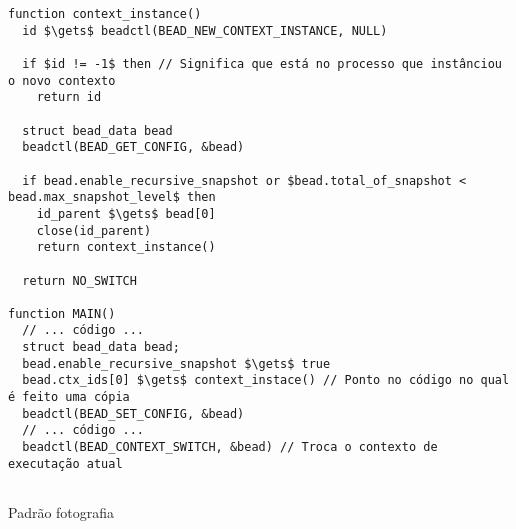\begin{pseudocode}
\begin{lstlisting}[language=pseudocode, style=pseudocode]
function context_instance()
  id $\gets$ beadctl(BEAD_NEW_CONTEXT_INSTANCE, NULL)

  if $id != -1$ then // Significa que está no processo que instânciou o novo contexto
    return id

  struct bead_data bead
  beadctl(BEAD_GET_CONFIG, &bead)

  if bead.enable_recursive_snapshot or $bead.total_of_snapshot < bead.max_snapshot_level$ then
    id_parent $\gets$ bead[0]
    close(id_parent)
    return context_instance()

  return NO_SWITCH

function MAIN()
  // ... código ...
  struct bead_data bead;
  bead.enable_recursive_snapshot $\gets$ true
  bead.ctx_ids[0] $\gets$ context_instace() // Ponto no código no qual é feito uma cópia
  beadctl(BEAD_SET_CONFIG, &bead)
  // ... código ...
  beadctl(BEAD_CONTEXT_SWITCH, &bead) // Troca o contexto de executação atual
  
\end{lstlisting}

  \label{alg:fotografia}
  \caption{Padrão fotografia}
\end{pseudocode}
